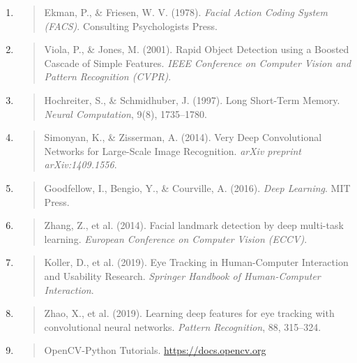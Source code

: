\documentclass[
]{article}
\begin{document}
\begin{enumerate}
\def\labelenumi{\arabic{enumi}.}
\item
  \begin{quote}
  Ekman, P., \& Friesen, W. V. (1978). \emph{Facial Action Coding System (FACS)}. Consulting Psychologists Press.
  \end{quote}
\item
  \begin{quote}
  Viola, P., \& Jones, M. (2001). Rapid Object Detection using a Boosted Cascade of Simple Features. \emph{IEEE Conference on Computer Vision and Pattern Recognition (CVPR)}.
  \end{quote}
\item
  \begin{quote}
  Hochreiter, S., \& Schmidhuber, J. (1997). Long Short-Term Memory. \emph{Neural Computation}, 9(8), 1735--1780.
  \end{quote}
\item
  \begin{quote}
  Simonyan, K., \& Zisserman, A. (2014). Very Deep Convolutional Networks for Large-Scale Image Recognition. \emph{arXiv preprint arXiv:1409.1556}.
  \end{quote}
\item
  \begin{quote}
  Goodfellow, I., Bengio, Y., \& Courville, A. (2016). \emph{Deep Learning}. MIT Press.
  \end{quote}
\item
  \begin{quote}
  Zhang, Z., et al. (2014). Facial landmark detection by deep multi-task learning. \emph{European Conference on Computer Vision (ECCV)}.
  \end{quote}
\item
  \begin{quote}
  Koller, D., et al. (2019). Eye Tracking in Human-Computer Interaction and Usability Research. \emph{Springer Handbook of Human-Computer Interaction}.
  \end{quote}
\item
  \begin{quote}
  Zhao, X., et al. (2019). Learning deep features for eye tracking with convolutional neural networks. \emph{Pattern Recognition}, 88, 315--324.
  \end{quote}
\item
  \begin{quote}
  OpenCV-Python Tutorials. \href{https://docs.opencv.org/}{\underline{https://docs.opencv.org\\
}}
\end{quote}
\end{enumerate}
\end{document}
